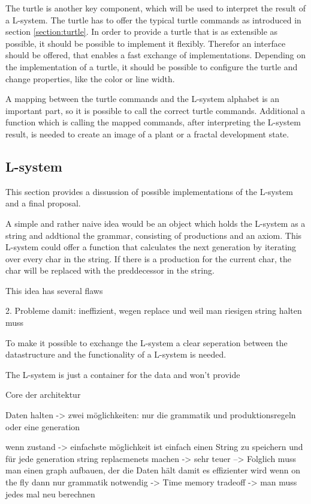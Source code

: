 \documentclass[english]{cpp-hmwk}
\begin{document}
\medskip

\noindent The turtle is another key component, which will be used to interpret the result of a L-system. The turtle has to offer the typical turtle commands as introduced in section \ref{section:turtle}. In order to provide a turtle that is as extensible as possible, it should be possible to implement it flexibly. Therefor an interface should be offered, that enables a fast exchange of implementations. Depending on the implementation of a turtle, it should be possible to configure the turtle and change properties, like the color or line width.

\medskip
\noindent A mapping between the turtle commands and the L-system alphabet is an important part, so it is possible to call the correct turtle commands. Additional a function which is calling the mapped commands, after interpreting the L-system result, is needed to create an image of a plant or a fractal development state.


\subsection{L-system}
This section provides a dissussion of possible implementations of the L-system and a final proposal.

\medskip

\noindent A simple and rather naive idea would be an object which holds the L-system as a string and addtional the grammar, consisting of productions and an axiom. This L-system could offer a function that calculates the next generation by iterating over every char in the string. If there is a production for the current char, the char will be replaced with the preddecessor in the string.

\medskip
\noindent This idea has several flaws 


2. Probleme damit: ineffizient, wegen replace und weil man riesigen string halten muss


To make it possible to exchange the L-system a clear seperation between the datastructure and the functionality of a L-system is needed.

 The L-system is just a container for the data and won't provide 

Core der architektur

Daten halten -> zwei möglichkeiten: nur die grammatik und produktionsregeln oder eine generation  

wenn zustand -> einfachste möglichkeit ist einfach einen String zu speichern und für jede generation string replacmenets machen -> sehr teuer 
--> Folglich muss man einen graph aufbauen, der die Daten hält damit es effizienter wird
wenn on the fly dann nur grammatik notwendig -> Time memory tradeoff -> man muss jedes mal neu berechnen  
\end{document}
